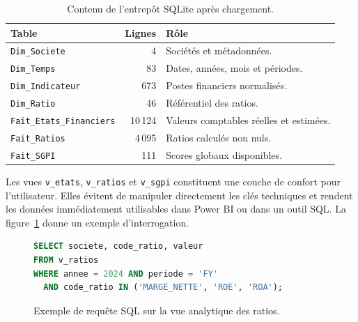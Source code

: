 \begin{table}[H]
\centering
\caption[Contenu de l'entrepôt SQLite]{Contenu de l'entrepôt SQLite après chargement.}
\label{tab:contenu_dw}
\begin{tabular}{|l|r|l|}
\hline
\textbf{Table} & \textbf{Lignes} & \textbf{Rôle} \\ \hline
\texttt{Dim\_Societe} & 4 & Sociétés et métadonnées. \\ \hline
\texttt{Dim\_Temps} & 83 & Dates, années, mois et périodes. \\ \hline
\texttt{Dim\_Indicateur} & 673 & Postes financiers normalisés. \\ \hline
\texttt{Dim\_Ratio} & 46 & Référentiel des ratios. \\ \hline
\texttt{Fait\_Etats\_Financiers} & 10\,124 & Valeurs comptables réelles et estimées. \\ \hline
\texttt{Fait\_Ratios} & 4\,095 & Ratios calculés non nuls. \\ \hline
\texttt{Fait\_SGPI} & 111 & Scores globaux disponibles. \\ \hline
\end{tabular}
\end{table}

\par Les vues \texttt{v\_etats}, \texttt{v\_ratios} et \texttt{v\_sgpi}
constituent une couche de confort pour l'utilisateur. Elles évitent de manipuler
directement les clés techniques et rendent les données immédiatement utilisables
dans Power BI ou dans un outil SQL. La figure~\ref{fig:requete_sql_exemple}
donne un exemple d'interrogation.

\begin{figure}[H]\centering
  \begin{minipage}{0.9\linewidth}
\begin{lstlisting}[language=SQL,numbers=none,basicstyle=\small\ttfamily]
SELECT societe, code_ratio, valeur
FROM v_ratios
WHERE annee = 2024 AND periode = 'FY'
  AND code_ratio IN ('MARGE_NETTE', 'ROE', 'ROA');
\end{lstlisting}
  \end{minipage}
  \caption[Exemple d'interrogation SQL]{Exemple de requête SQL sur la vue analytique des ratios.}
  \label{fig:requete_sql_exemple}
\end{figure}


